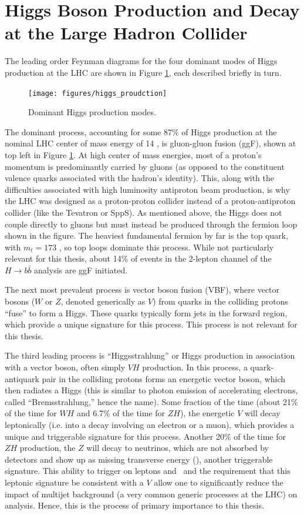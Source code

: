 \section{Higgs Boson Production and Decay at the Large Hadron Collider}
The leading order Feynman diagrams for the four dominant modes of Higgs production at the LHC are shown in Figure \ref{fig:hprod}, each described briefly in turn.
\begin{figure}[!htbp]\captionsetup{justification=centering}
  \centering
  \texttt{[image: figures/higgs\_proudction]}
  \caption{Dominant Higgs production modes.}
  \label{fig:hprod}
\end{figure}
The dominant process, accounting for some 87\% of Higgs production at the nominal LHC center of mass energy of 14 \tev, is gluon-gluon fusion (ggF), shown at top left in Figure \ref{fig:hprod}.  At high center of mass energies, most of a proton's momentum is predominantly carried by gluons (as opposed to the constituent valence quarks associated with the hadron's identity).  This, along with the difficulties associated with high luminosity antiproton beam production, is why the LHC was designed as a proton-proton collider instead of a proton-antiproton collider (like the Tevatron or SppS).  As mentioned above, the Higgs does not couple directly to gluons but must instead be produced through the fermion loop shown in the figure.  The heaviest fundamental fermion by far is the top quark, with $m_t=173$ \gev, so top loops dominate this process.  While not particularly relevant for this thesis, about 14\% of events in the 2-lepton channel of the $H\to b\bar{b}$ analysis are ggF initiated.

The next most prevalent process is vector boson fusion (VBF), where vector bosons ($W$ or $Z$, denoted generically as $V$) from quarks in the colliding protons ``fuse'' to form a Higgs.  These quarks typically form jets in the forward region, which provide a unique signature for this process.  This process is not relevant for this thesis.

The third leading process is ``Higgsstrahlung'' or Higgs production in association with a vector boson, often simply $VH$ production.  In this process, a quark-antiquark pair in the colliding protons forms an energetic vector boson, which then radiates a Higgs (this is similar to photon emission of accelerating electrons, called ``Bremsstrahlung,'' hence the name).  Some fraction of the time (about 21\% of the time for $WH$ and 6.7\% of the time for $ZH$), the energetic $V$ will decay leptonically (i.e. into a decay involving an electron or a muon), which provides a unique and triggerable signature for this process.  Another 20\% of the time for $ZH$ production, the $Z$ will decay to neutrinos, which are not absorbed by detectors and show up as missing transverse energy (\met), another triggerable signature.  This ability to trigger on leptons and \met\, and the requirement that this leptonic signature be consistent with a $V$ allow one to significantly reduce the impact of multijet background (a very common generic processes at the LHC) on analysis.  Hence, this is the process of primary importance to this thesis.

